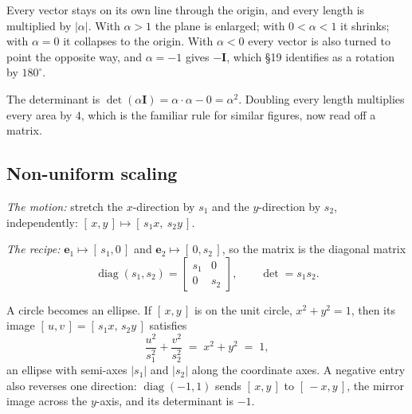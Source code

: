 \documentclass[11pt]{article}
\theoremstyle{plain}
\theoremstyle{definition}
\theoremstyle{remark}
\newcommand{\vc}[1]{\mathbf{#1}}
\newcommand{\mt}[1]{\mathbf{#1}}
\DeclareMathOperator{\diagop}{diag}
\newcommand{\Fshape}{(0.15,0.1) -- (0.35,0.1) -- (0.35,0.45) -- (0.65,0.45)
  -- (0.65,0.6) -- (0.35,0.6) -- (0.35,0.75) -- (0.8,0.75) -- (0.8,0.9)
  -- (0.15,0.9) -- cycle}
\newcommand{\actionpic}[4]{%
  \begin{scope}
    \clip (-2.2,-2.2) rectangle (2.4,2.4);
    \draw[step=1cm,gray!22,very thin] (-3,-3) grid (3,3);
  \end{scope}
  \draw[axisline] (-2.2,0) -- (2.6,0);
  \draw[axisline] (0,-2.2) -- (0,2.6);
  \draw[gray!55,dashed] (0,0) -- (1,0) -- (1,1) -- (0,1) -- cycle;
  \fill[gray!30] \Fshape;
  \begin{scope}[cm={#1,#3,#2,#4,(0,0)}]
    \fill[RoyalBlue!15] (0,0) -- (1,0) -- (1,1) -- (0,1) -- cycle;
    \draw[RoyalBlue!60] (0,0) -- (1,0) -- (1,1) -- (0,1) -- cycle;
    \fill[RoyalBlue!75] \Fshape;
  \end{scope}}
\newcommand{\eone}[2]{\draw[vecarr,BrickRed] (0,0) -- (#1,#2);}
\newcommand{\etwo}[2]{\draw[vecarr,ForestGreen] (0,0) -- (#1,#2);}
\newcommand{\piclabel}[1]{\node[font=\small,align=center,anchor=north] at (0.1,-2.45) {#1};}
\begin{document}
\noindent Every vector stays on its own line through the origin, and every
length is multiplied by $|\alpha|$. With $\alpha>1$ the plane is enlarged; with
$0<\alpha<1$ it shrinks; with $\alpha=0$ it collapses to the origin. With
$\alpha<0$ every vector is also turned to point the opposite way, and
$\alpha=-1$ gives $-\mt{I}$, which \S19 identifies as a rotation by
$180^\circ$.

The determinant is $\det(\alpha\mt{I})=\alpha\cdot\alpha-0=\alpha^{2}$. Doubling
every length multiplies every area by $4$, which is the familiar rule for
similar figures, now read off a matrix.

\subsection{Non-uniform scaling}
\emph{The motion:} stretch the $x$-direction by $s_1$ and the $y$-direction by
$s_2$, independently: $[\,x,y\,]\mapsto[\,s_1x,\ s_2y\,]$.

\emph{The recipe:} $\vc{e}_1\mapsto[\,s_1,0\,]$ and
$\vc{e}_2\mapsto[\,0,s_2\,]$, so the matrix is the diagonal matrix
\[
  \diagop(s_1,s_2)=\begin{bmatrix}s_1&0\\0&s_2\end{bmatrix},
  \qquad
  \det=s_1s_2 .
\]

\noindent A circle becomes an ellipse. If $[\,x,y\,]$ is on the unit circle,
$x^{2}+y^{2}=1$, then its image $[\,u,v\,]=[\,s_1x,\,s_2y\,]$ satisfies
\[
  \frac{u^{2}}{s_1^{2}}+\frac{v^{2}}{s_2^{2}} \;=\; x^{2}+y^{2} \;=\; 1 ,
\]
an ellipse with semi-axes $|s_1|$ and $|s_2|$ along the coordinate axes.
A negative entry also reverses one direction: $\diagop(-1,1)$ sends
$[\,x,y\,]$ to $[\,-x,y\,]$, the mirror image across the $y$-axis, and its
determinant is $-1$.

\begin{center}
\end{center}
\end{document}
